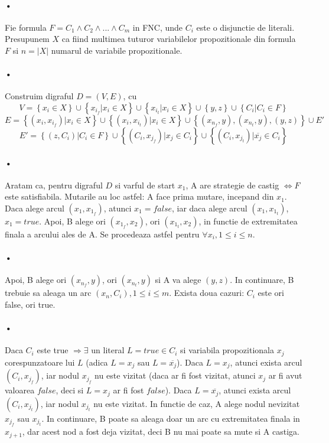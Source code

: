 \documentclass[paper=a4, fontsize=11pt]{scrartcl}
\begin{document}
\paragraph{•}
Fie formula $F = C_1 \land C_2 \land ... \land C_m$ in FNC, unde $C_i$ este o disjunctie de literali. Presupunem $X$ ca fiind multimea tuturor variabilelor propozitionale din formula $F$ si $n = |X|$ numarul de variabile propozitionale.
\paragraph{•}
Construim digraful $D=(V, E)$, cu
\[ V = \left\{x_i \in X\right\} \cup \left\{x_{i_f} | x_i \in X\right\} \cup \left\{x_{i_t} | x_i \in X\right\} \cup \left\{y, z\right\} \cup \left\{C_i | C_i \in F\right\}\]
\[E = \left\{(x_i, x_{i_f}) | x_i \in X\right\} \cup \left\{(x_i, x_{i_t}) | x_i \in X\right\} \cup \left\{(x_{n_f}, y), (x_{n_t}, y), (y, z)\right\} \cup E' \]
\[E' = \left\{(z, C_i) | C_i \in F \right\} \cup \left\{(C_i, x_{j_f}) | x_j \in C_i\right\} \cup \left\{(C_i, x_{j_t}) | \overline{x_j} \in C_i\right\}\]
\paragraph{•}
Aratam ca, pentru digraful $D$ si varful de start $x_1$, A are strategie de castig $\iff F$ este satisfiabila. Mutarile au loc astfel: A face prima mutare, incepand din $x_1$. Daca alege arcul $(x_1, x_{1_f})$, atunci $x_1 = false$, iar daca alege arcul $(x_1, x_{1_t})$, $x_1 = true$. Apoi, B alege ori $(x_{1_f}, x_2)$, ori $(x_{1_t}, x_2)$, in functie de extremitatea finala a arcului ales de A. Se procedeaza astfel pentru $\forall x_i, 1\leq{i}\leq{n}$.
\paragraph{•}
Apoi, B alege ori $(x_{n_f}, y)$, ori $(x_{n_t}, y)$ si A va alege $(y, z)$. In continuare, B trebuie sa aleaga un arc $(x_n, C_i), 1\leq{i}\leq{m}$. Exista doua cazuri: $C_i$ este ori false, ori true.
\paragraph{•}
Daca $C_i$ este true $\Rightarrow \exists $ un literal $L=true\in{C_i}$ si variabila propozitionala $x_j$ corespunzatoare lui $L$ (adica $L=x_j$ sau $L=\overline{x_j}$). Daca $L=x_j$, atunci exista arcul $(C_i, x_{j_f})$, iar nodul $x_{j_f}$ nu este vizitat (daca ar fi fost vizitat, atunci $x_j$ ar fi avut valoarea $false$, deci si $L=x_j$ ar fi fost $false$). Daca $L=\overline{x_j}$, atunci exista arcul $(C_i, x_{j_t})$, iar nodul $x_{j_t}$ nu este vizitat. In functie de caz, A alege nodul nevizitat $x_{j_f}$ sau $x_{j_t}$. In continuare, B poate sa aleaga doar un arc cu extremitatea finala in $x_{j+1}$, dar acest nod a fost deja vizitat, deci B nu mai poate sa mute si A castiga.
\end{document}
